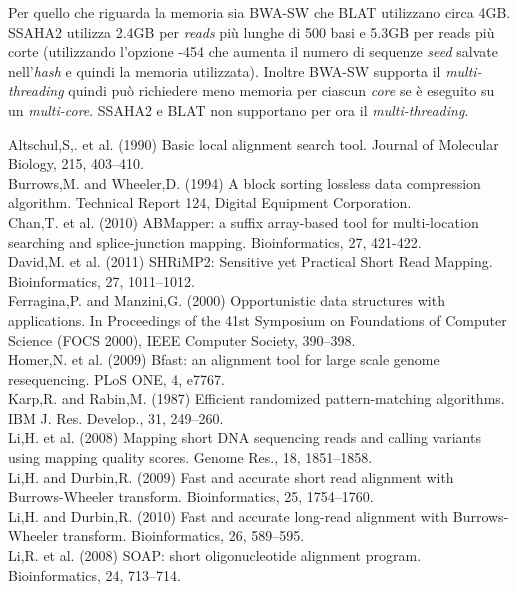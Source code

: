\documentclass[conference]{IEEEtran}
\begin{document}
Per quello che riguarda la memoria sia BWA-SW che BLAT utilizzano circa 4GB. SSAHA2 utilizza 2.4GB per \textit{reads} più lunghe di 500 basi e 5.3GB per reads più corte (utilizzando l'opzione -454 che aumenta il numero di sequenze \textit{seed} salvate nell'\textit{hash} e quindi la memoria utilizzata). Inoltre BWA-SW supporta il \textit{multi-threading} quindi può richiedere meno memoria per ciascun \textit{core} se è eseguito su un \textit{multi-core}. SSAHA2 e BLAT non supportano per ora il \textit{multi-threading}.

\begin{thebibliography}{1}

\bibitem{}
Altschul,S,. et al. (1990) Basic local alignment search tool. Journal of Molecular Biology, 215, 403–410. \\
\bibitem{}
Burrows,M. and Wheeler,D. (1994) A block sorting lossless data compression algorithm. Technical Report 124, Digital Equipment Corporation.\\
\bibitem{}
Chan,T. et al. (2010) ABMapper: a suffix array-based tool for multi-location searching and splice-junction mapping. Bioinformatics, 27, 421-422.\\
\bibitem{}
David,M. et al. (2011) SHRiMP2: Sensitive yet Practical Short Read Mapping. Bioinformatics, 27, 1011–1012.\\
\bibitem{}
Ferragina,P. and Manzini,G. (2000) Opportunistic data structures with applications. In Proceedings of the 41st Symposium on Foundations of Computer Science (FOCS 2000), IEEE Computer Society, 390–398.\\
\bibitem{}
Homer,N. et al. (2009) Bfast: an alignment tool for large scale genome resequencing. PLoS ONE, 4, e7767.\\
\bibitem{}
Karp,R. and Rabin,M. (1987) Efficient randomized pattern-matching algorithms. IBM J. Res. Develop., 31, 249–260.\\
\bibitem{}
Li,H. et al. (2008) Mapping short DNA sequencing reads and calling variants using mapping quality scores. Genome Res., 18, 1851–1858.\\
\bibitem{}
Li,H. and Durbin,R. (2009) Fast and accurate short read alignment with Burrows-Wheeler transform. Bioinformatics, 25, 1754–1760.\\
\bibitem{}
Li,H. and Durbin,R. (2010) Fast and accurate long-read alignment with Burrows-Wheeler transform. Bioinformatics, 26, 589–595.\\
\bibitem{}
Li,R. et al. (2008) SOAP: short oligonucleotide alignment program. Bioinformatics, 24, 713–714.\\

\end{thebibliography}
\end{document}
